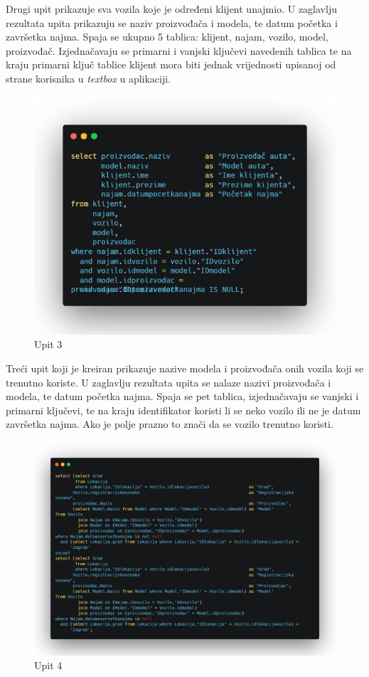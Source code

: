 \documentclass[]{foi}
\begin{document}
Drugi upit prikazuje sva vozila koje je određeni klijent unajmio. U zaglavlju rezultata upita prikazuju se naziv proizvođača i modela, te datum početka i završetka najma. Spaja se ukupno 5 tablica: klijent, najam, vozilo, model, proizvođač. Izjednačavaju se primarni i vanjski ključevi navedenih tablica te na kraju primarni ključ tablice klijent mora biti jednak vrijednosti upisanoj od strane korisnika u \textit{textbox} u aplikaciji.\\

\begin{figure}[!ht]
    \centering
    \includegraphics[width=1\textwidth]{slike/u3.png}
    \caption{Upit 3}
    \label{fig:upit3}
\end{figure}

Treći upit koji je kreiran prikazuje nazive modela i proizvođača onih vozila koji se trenutno koriste. U zaglavlju rezultata upita se nalaze nazivi proizvođača i modela, te datum početka najma. Spaja se pet tablica, izjednačavaju se vanjski i primarni ključevi, te na kraju identifikator koristi li se neko vozilo ili ne je datum završetka najma. Ako je polje prazno to znači da se vozilo trenutno koristi.
\newpage

\begin{figure}[!ht]
    \centering
    \includegraphics[width=1\textwidth]{slike/u4.png}
    \caption{Upit 4}
    \label{fig:upit4}
\end{figure}
\end{document}
